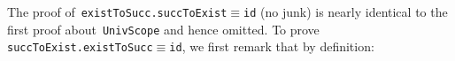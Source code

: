 \documentclass[9pt,preprint,authoryear]{sigplanconf}
\begin{document}
%
The proof of{~}\textcolor[rgb]{0,0,0.80}{\texttt{existToSucc}}\textcolor[rgb]{0,0,0.80}{\texttt{\mbox{\hspace{0.50em}}}}\textcolor[cmyk]{0,0.65,0.99,0}{\texttt{.}}\textcolor[rgb]{0,0,0.80}{\texttt{\mbox{\hspace{0.50em}}}}\textcolor[rgb]{0,0,0.80}{\texttt{succToExist}}\textcolor[rgb]{0,0,0.80}{\texttt{\mbox{\hspace{0.50em}}}}\textcolor[cmyk]{0,0.65,0.99,0}{\texttt{$ \equiv $}}\textcolor[rgb]{0,0,0.80}{\texttt{\mbox{\hspace{0.50em}}}}\textcolor[rgb]{0,0,0.80}{\texttt{id}} (no junk) is nearly identical
    to the first proof about{~}\textcolor[rgb]{0,0,0.80}{\texttt{UnivScope}} and hence omitted. To
    prove \textcolor[rgb]{0,0,0.80}{\texttt{succToExist}}\textcolor[rgb]{0,0,0.80}{\texttt{\mbox{\hspace{0.50em}}}}\textcolor[cmyk]{0,0.65,0.99,0}{\texttt{.}}\textcolor[rgb]{0,0,0.80}{\texttt{\mbox{\hspace{0.50em}}}}\textcolor[rgb]{0,0,0.80}{\texttt{existToSucc}}\textcolor[rgb]{0,0,0.80}{\texttt{\mbox{\hspace{0.50em}}}}\textcolor[cmyk]{0,0.65,0.99,0}{\texttt{$ \equiv $}}\textcolor[rgb]{0,0,0.80}{\texttt{\mbox{\hspace{0.50em}}}}\textcolor[rgb]{0,0,0.80}{\texttt{id}}, we first remark that by
    definition{:}%


%
%


{\nopagebreak }
\end{document}
